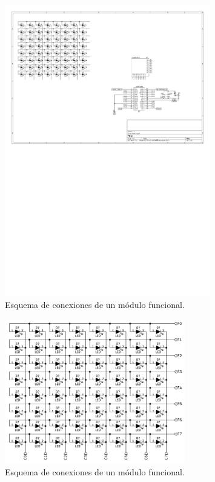 \begin{figure}[ht!]
	\begin{center}
		\includegraphics[width=0.8\textwidth]{imagenes/hw/moduloEsquematico}
		\caption{Esquema de conexiones de un módulo funcional.}
		\label{fig:hw-moduloEsquematico}
	\end{center}
\end{figure}


\begin{figure}[ht!]
	\begin{center}
		\includegraphics[width=0.7\textwidth]{imagenes/hw/moduloLED}
		\caption{Esquema de conexiones de un módulo funcional.}
		\label{fig:hw-moduloLED}
	\end{center}
\end{figure}

